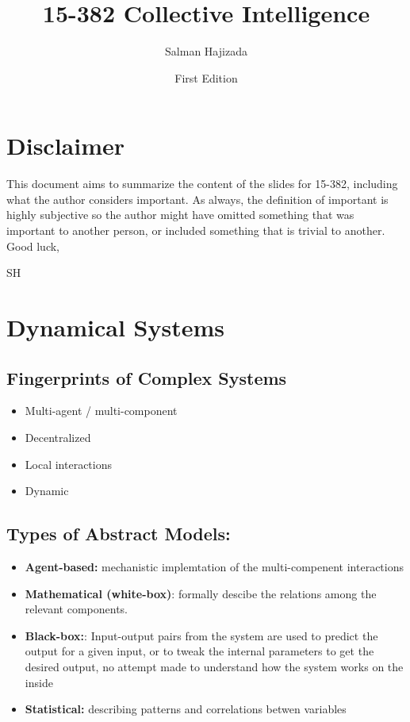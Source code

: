 \documentclass{report}
\title{15-382 Collective Intelligence}
\date{First Edition}
\author{Salman Hajizada}
\begin{document}
\maketitle

\setcounter{chapter}{-1}
\chapter*{Disclaimer}
This document aims to summarize the content of the slides for 15-382, including
what the author considers important. As always, the definition of important is
highly subjective so the author might have omitted something that was
important to another person, or included something that is trivial to another.\\

Good luck,

SH

\chapter*{Dynamical Systems}

\section*{Fingerprints of Complex Systems}

\begin{itemize}
    \item Multi-agent / multi-component
    \item Decentralized
    \item Local interactions
    \item Dynamic
\end{itemize}

\section*{Types of Abstract Models:}

\begin{itemize}
    \item \textbf{Agent-based:} mechanistic implemtation of the multi-compenent interactions
    \item \textbf{Mathematical (white-box)}: formally descibe the relations among the relevant components.
    \item \textbf{Black-box:}: Input-output pairs from the system are used to predict the output for a given input, or to tweak the internal parameters to get the desired output, no attempt made to understand how the system works on the inside
    \item \textbf{Statistical:} describing patterns and correlations betwen variables
\end{itemize}
\end{document}

